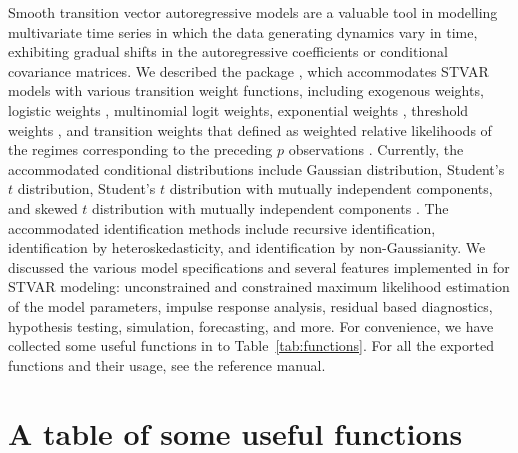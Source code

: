 \documentclass[nojss]{jss}
\begin{document}
Smooth transition vector autoregressive models are a valuable tool in modelling multivariate time series in which the data generating dynamics vary in time, exhibiting gradual shifts in the autoregressive coefficients or conditional covariance matrices. We described the  package , which accommodates STVAR models with various transition weight functions, including exogenous weights, logistic weights \citep{Anderson+Vahid:1998}, multinomial logit weights, exponential weights \citep[e.g.,][]{Hubrich+Terasvirta:2013}, threshold weights \citep{Tsay:1998}, and transition weights that defined as weighted relative likelihoods of the regimes corresponding to the preceding $p$ observations \citep{Lanne+Virolainen:2024}. Currently, the accommodated conditional distributions include Gaussian distribution, Student's $t$ distribution, Student's $t$ distribution with mutually independent components, and skewed $t$ distribution with mutually independent components \citep[see][]{Hansen:1994}. The accommodated identification methods include recursive identification, identification by heteroskedasticity, and identification by non-Gaussianity. We discussed the various model specifications and several features implemented in  for STVAR modeling: unconstrained and constrained maximum likelihood estimation of the model parameters, impulse response analysis, residual based diagnostics, hypothesis testing, simulation, forecasting, and more. For convenience, we have collected some useful functions in  to Table~\ref{tab:functions}. For all the exported functions and their usage, see the reference manual.


\cleardoublepage
\section*{A table of some useful functions}\label{sec:table}
\end{document}
